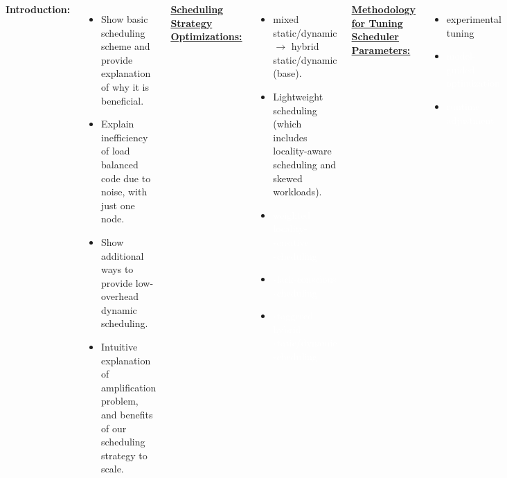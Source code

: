 \begin{frame}
\begin{columns}[T]
  \textbf{Introduction:}\\
    \begin{itemize} 
      \tiny \item \tiny Show basic scheduling scheme and provide explanation of why it is beneficial. 
    \item \tiny Explain inefficiency of load balanced code due to noise, with just one node. 
    \item \tiny Show additional ways to provide low-overhead dynamic scheduling. 
    \item \tiny Intuitive explanation of amplification problem, and benefits of our scheduling strategy to scale. 
    \end{itemize}
    \vrule{10in}{1pt}
           {\tiny  \underline{\textbf{Scheduling Strategy Optimizations:}}}\\
           \begin{itemize}
             \tiny \item \tiny mixed static/dynamic $\rightarrow$ hybrid static/dynamic  (base). 
           \item \tiny Lightweight scheduling (which includes locality-aware scheduling and skewed workloads). 
           \item \tiny \textcolor{white} {weighted locality-sensitive scheduling}
           \item \tiny \textcolor{white} {slack-conscious scheduling}
           \item \tiny \textcolor{white} {staggered hybrid static/dynamic scheduling}
           \end{itemize}
               {\tiny \underline{\textbf { Methodology for Tuning Scheduler Parameters:}}}\\
               \begin{itemize}
                \tiny \item \tiny experimental tuning
               \item \tiny \textcolor{white} {model-guided optimization} %
               \item \tiny \textcolor{white} {runtime adjustment}  %
               \end{itemize}
\end{columns}  
\end{frame} 

